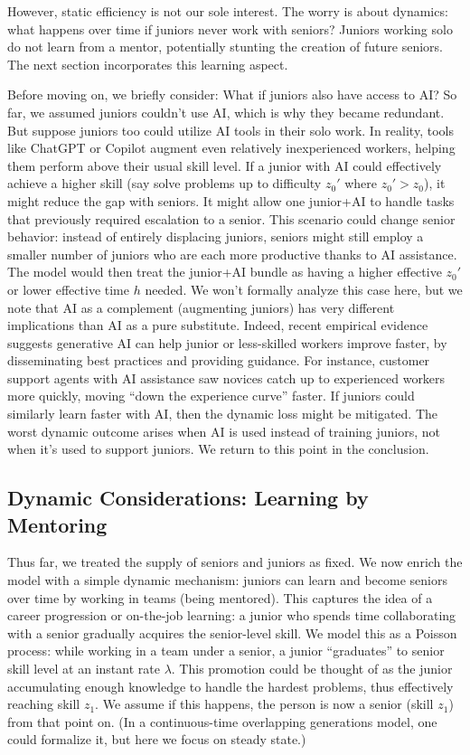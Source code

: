 \documentclass[12pt]{article}
\begin{document}
However, static efficiency is not our sole interest. {The worry
is about dynamics: what happens over time if juniors never work with
seniors?} Juniors working solo do not learn from a mentor, potentially
stunting the creation of future seniors. The next section incorporates
this learning aspect.

Before moving on, we briefly consider: {What if juniors also have
access to AI?} So far, we assumed juniors couldn't use AI, which is why
they became redundant. But suppose juniors too could utilize AI tools in
their solo work. In reality, tools like ChatGPT or Copilot {augment
even relatively inexperienced workers}, helping them perform above their
usual skill level. If a junior with AI could effectively achieve a
higher skill (say solve problems up to difficulty \(z_0'\) where
\(z_0' > z_0\)), it might reduce the gap with seniors. It might allow
one junior+AI to handle tasks that previously required escalation to a
senior. This scenario could {change senior behavior}: instead of
entirely displacing juniors, seniors might still employ a smaller number
of juniors who are each more productive thanks to AI assistance. The
model would then treat the junior+AI bundle as having a higher effective
\(z_0'\) or lower effective time \(h\) needed. We won't formally analyze
this case here, but we note that {AI as a complement (augmenting
juniors)} has very different implications than AI as a pure substitute.
Indeed, recent empirical evidence suggests generative AI can {help
junior or less-skilled workers improve faster}, by disseminating best
practices and providing guidance. For instance, customer support agents
with AI assistance saw novices catch up to experienced workers more
quickly, moving ``down the experience curve'' faster. If juniors could
similarly learn faster with AI, then the dynamic loss might be
mitigated. The worst dynamic outcome arises when AI is {used
instead of training juniors}, not when it's used to support juniors. We
return to this point in the conclusion.

\subsection{Dynamic Considerations: Learning by
Mentoring}\label{dynamic-considerations-learning-by-mentoring}

Thus far, we treated the supply of seniors and juniors as fixed. We now
enrich the model with a {simple dynamic mechanism: juniors can
learn and become seniors over time by working in teams (being
mentored)}. This captures the idea of a {career progression or
on-the-job learning}: a junior who spends time collaborating with a
senior gradually acquires the senior-level skill. We model this as a
{Poisson process}: while working in a team under a senior, a
junior ``graduates'' to senior skill level at an instant rate
\(\lambda\). This promotion could be thought of as the junior
accumulating enough knowledge to handle the hardest problems, thus
effectively reaching skill \(z_1\). We assume if this happens, the
person is now a senior (skill \(z_1\)) from that point on. (In a
continuous-time overlapping generations model, one could formalize it,
but here we focus on steady state.)
\end{document}

